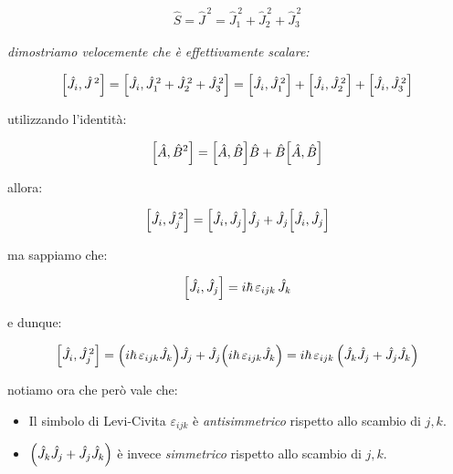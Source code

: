\begin{mydef}
\begin{align*}
	\hat{S} = \hat{J}^{\, 2} = \hat{J}_1^{\, 2} + \hat{J}_2^{\, 2} + \hat{J}_3^{\, 2}
\end{align*}
\end{mydef}

	\textit{dimostriamo velocemente che è effettivamente scalare:}
	
\begin{myprf}
	
\begin{align*}
	\qty[\hat{J}_i, \hat{J}^{\, 2}]  = \qty[\hat{J}_i, \hat{J}_1^{\, 2} + \hat{J}_2^{\, 2} + \hat{J}_3^{\, 2}] =  \qty[\hat{J}_i, \hat{J}_1^{\, 2}] + \qty[\hat{J}_i, \hat{J}_2^{\, 2}] + \qty[\hat{J}_i, \hat{J}_3^{\, 2}] 
\end{align*}

	utilizzando l'identità:
	
\begin{align*}
	\qty[\hat{A}, \hat{B}^2] = \qty[\hat{A}, \hat{B}] \hat{B} + \hat{B} \qty[\hat{A}, \hat{B}]
\end{align*}

	allora:
	
\begin{align*}
	\qty[\hat{J}_i, \hat{J}_{j}^{\, 2}] = \qty[\hat{J}_i, \hat{J}_j] \hat{J}_j +\hat{J}_j \qty[\hat{J}_i, \hat{J}_j]
\end{align*}

	ma sappiamo che:
	
\begin{align*}
	\qty[\hat{J}_i, \hat{J}_{j}] = i\hbar \, \varepsilon_{ijk} \, \hat{J}_k
\end{align*}

	e dunque:
	
\begin{align*}
	\qty[ \hat{J}_i, \hat{J}_j^{\, 2} ] = \qty(i \hbar \, \varepsilon_{ijk} \hat{J}_k)\hat{J}_j + \hat{J}_j  \qty(i \hbar \, \varepsilon_{ijk} \hat{J}_k) = i \hbar \, \varepsilon_{ijk} \, \qty( \hat{J}_k\hat{J}_j + \hat{J}_j\hat{J}_k )
\end{align*}

	notiamo ora che però vale che:
	
\begin{itemize}
	\item Il simbolo di Levi-Civita $\varepsilon_{ijk}$ è \textit{antisimmetrico} rispetto allo scambio di $j, k$.
	\item $ \qty( \hat{J}_k\hat{J}_j + \hat{J}_j\hat{J}_k )$ è invece \textit{simmetrico} rispetto allo scambio di $j, k$.
\end{itemize}


\end{myprf}
